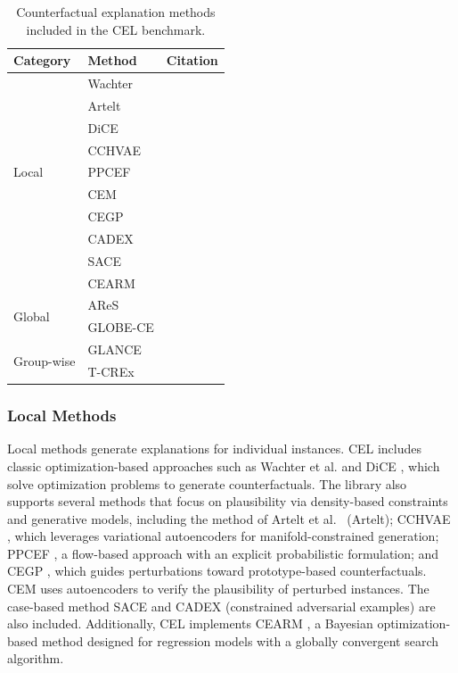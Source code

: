 \documentclass[runningheads]{llncs}
\begin{document}
\begin{table}[h!]
\centering
\caption{Counterfactual explanation methods included in the CEL benchmark.}
\label{tab:methods}
\begin{tabular}{l l l}
\toprule
\textbf{Category} & \textbf{Method} & \textbf{Citation} \\
\midrule
\multirow{9}{*}{Local} & Wachter & \cite{wachter2017counterfactual} \\
& Artelt & \cite{artelt2020convex} \\
& DiCE & \cite{mothilal2020explaining} \\
& CCHVAE & \cite{karimi2020model} \\
& PPCEF & \cite{wielopolski2024probabilistically} \\
& CEM & \cite{DhurandharCLTTS18} \\
& CEGP & \cite{LooverenK21} \\
& CADEX & \cite{moore2019explaining} \\
& SACE & \cite{keane2020good} \\
& CEARM & \cite{spooner2021counterfactual} \\
\midrule
\multirow{2}{*}{Global} & AReS & \cite{rawal2020beyond} \\
& GLOBE-CE & \cite{ley2023globe} \\
\midrule
\multirow{2}{*}{Group-wise} & GLANCE & \cite{kavouras2024glance} \\
& T-CREx & \cite{bewley2024tcrex} \\
\bottomrule
\end{tabular}
\end{table}

\subsubsection{Local Methods}
Local methods generate explanations for individual instances. CEL includes classic optimization-based approaches such as Wachter et al. \cite{wachter2017counterfactual} and DiCE \cite{mothilal2020explaining}, which solve optimization problems to generate counterfactuals. The library also supports several methods that focus on plausibility via density-based constraints and generative models, including the method of Artelt et al.~\cite{artelt2020convex} (Artelt); CCHVAE \cite{karimi2020model}, which leverages variational autoencoders for manifold-constrained generation; PPCEF \cite{wielopolski2024probabilistically}, a flow-based approach with an explicit probabilistic formulation; and CEGP \cite{LooverenK21}, which guides perturbations toward prototype-based counterfactuals. CEM \cite{DhurandharCLTTS18} uses autoencoders to verify the plausibility of perturbed instances. The case-based method SACE \cite{keane2020good} and CADEX \cite{moore2019explaining} (constrained adversarial examples) are also included. Additionally, CEL implements CEARM \cite{spooner2021counterfactual}, a Bayesian optimization-based method designed for regression models with a globally convergent search algorithm.
\end{document}
